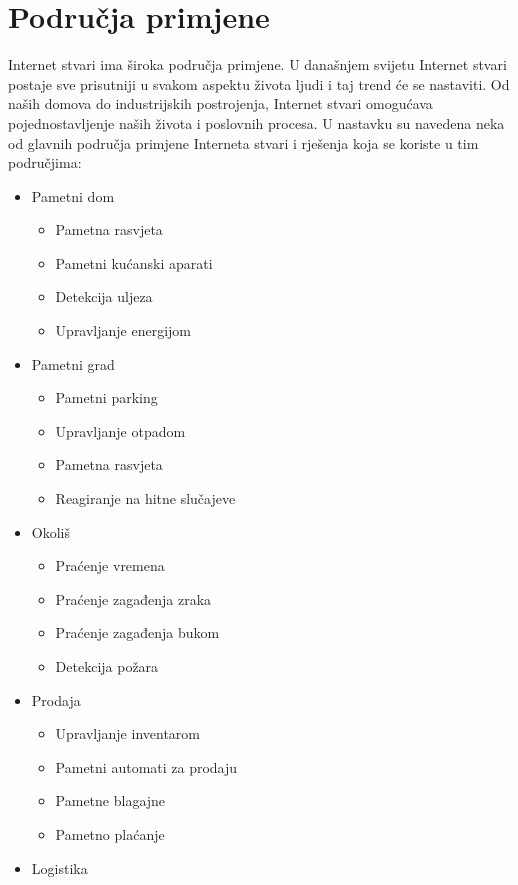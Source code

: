 \documentclass[times, utf8, diplomski]{fer}
\begin{document}
\section{Područja primjene}
Internet stvari ima široka područja primjene. U današnjem svijetu Internet stvari postaje sve prisutniji u svakom aspektu života ljudi i taj trend će se nastaviti. Od naših domova do industrijskih postrojenja, Internet stvari omogućava pojednostavljenje naših života i poslovnih procesa. U nastavku su navedena neka od glavnih područja primjene Interneta stvari i rješenja koja se koriste u tim područjima:
\begin{itemize}
    \item Pametni dom
    \begin{itemize}
        \item Pametna rasvjeta
        \item Pametni kućanski aparati
        \item Detekcija uljeza
        \item Upravljanje energijom
    \end{itemize}
    \item Pametni grad
    \begin{itemize}
        \item Pametni parking
        \item Upravljanje otpadom
        \item Pametna rasvjeta
        \item Reagiranje na hitne slučajeve
    \end{itemize}
    \item Okoliš
    \begin{itemize}
        \item Praćenje vremena
        \item Praćenje zagađenja zraka
        \item Praćenje zagađenja bukom
        \item Detekcija požara
    \end{itemize}
    \item Prodaja
    \begin{itemize}
        \item Upravljanje inventarom
        \item Pametni automati za prodaju
        \item Pametne blagajne
        \item Pametno plaćanje
    \end{itemize}
    \item Logistika

\end{itemize}
\end{document}
